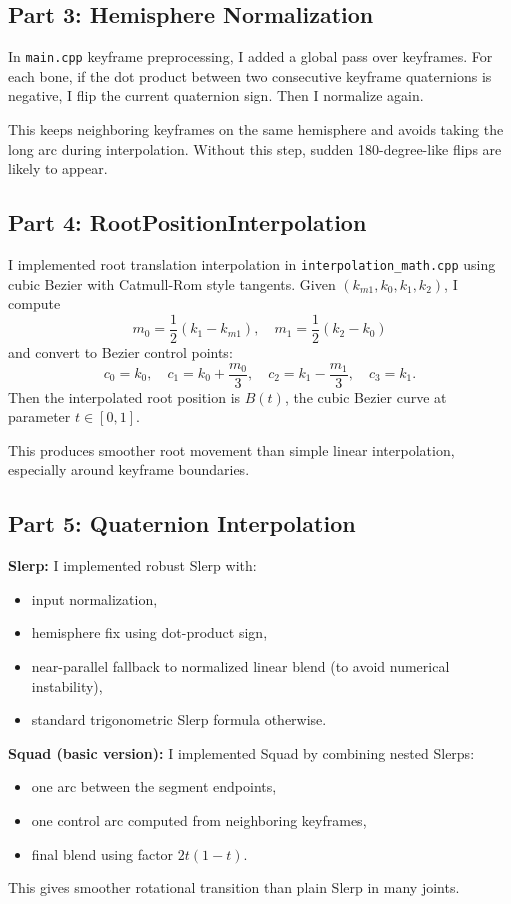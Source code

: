 \documentclass[11pt,a4paper]{article}
\begin{document}
\subsection{Part 3: Hemisphere Normalization}
In \texttt{main.cpp} keyframe preprocessing, I added a global pass over keyframes.
For each bone, if the dot product between two consecutive keyframe quaternions is negative, I flip the current quaternion sign.
Then I normalize again.

This keeps neighboring keyframes on the same hemisphere and avoids taking the long arc during interpolation.
Without this step, sudden 180-degree-like flips are likely to appear.

\subsection{Part 4: RootPositionInterpolation}
I implemented root translation interpolation in \texttt{interpolation\_math.cpp} using cubic Bezier with Catmull-Rom style tangents.
Given \((k_{m1}, k_0, k_1, k_2)\), I compute
\[
m_0 = \frac{1}{2}(k_1-k_{m1}), \quad
m_1 = \frac{1}{2}(k_2-k_0)
\]
and convert to Bezier control points:
\[
c_0 = k_0,\quad
c_1 = k_0 + \frac{m_0}{3},\quad
c_2 = k_1 - \frac{m_1}{3},\quad
c_3 = k_1.
\]
Then the interpolated root position is \(B(t)\), the cubic Bezier curve at parameter \(t\in[0,1]\).

This produces smoother root movement than simple linear interpolation, especially around keyframe boundaries.

\subsection{Part 5: Quaternion Interpolation}
\textbf{Slerp:}
I implemented robust Slerp with:
\begin{itemize}
    \item input normalization,
    \item hemisphere fix using dot-product sign,
    \item near-parallel fallback to normalized linear blend (to avoid numerical instability),
    \item standard trigonometric Slerp formula otherwise.
\end{itemize}

\textbf{Squad (basic version):}
I implemented Squad by combining nested Slerps:
\begin{itemize}
    \item one arc between the segment endpoints,
    \item one control arc computed from neighboring keyframes,
    \item final blend using factor \(2t(1-t)\).
\end{itemize}
This gives smoother rotational transition than plain Slerp in many joints.
\end{document}
